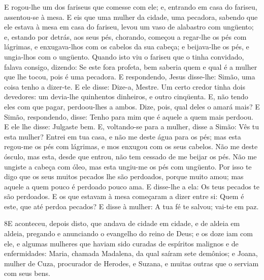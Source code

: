 E rogou-lhe um dos fariseus que comesse com ele; e, entrando em
casa do fariseu, assentou-se à mesa. E eis que uma mulher da
cidade, uma pecadora, sabendo que ele estava à mesa em casa do
fariseu, levou um vaso de alabastro com ungüento; e, estando
por detrás, aos seus pés, chorando, começou a regar-lhe os pés com
lágrimas, e enxugava-lhos com os cabelos da sua cabeça; e
beijava-lhe os pés, e ungia-lhos com o ungüento. Quando isto
viu o fariseu que o tinha convidado, falava consigo, dizendo: Se
este fora profeta, bem saberia quem e qual é a mulher que lhe tocou,
pois é uma pecadora. E respondendo, Jesus disse-lhe: Simão,
uma coisa tenho a dizer-te. E ele disse: Dize-a, Mestre. Um
certo credor tinha dois devedores: um devia-lhe quinhentos
dinheiros, e outro cinqüenta. E, não tendo eles com que
pagar, perdoou-lhes a ambos. Dize, pois, qual deles o amará mais?
E Simão, respondendo, disse: Tenho para mim que é aquele a
quem mais perdoou. E ele lhe disse: Julgaste bem. E,
voltando-se para a mulher, disse a Simão: Vês tu esta mulher? Entrei
em tua casa, e não me deste água para os pés; mas esta regou-me os
pés com lágrimas, e mos enxugou com os seus cabelos. Não me
deste ósculo, mas esta, desde que entrou, não tem cessado de me
beijar os pés. Não me ungiste a cabeça com óleo, mas esta
ungiu-me os pés com ungüento. Por isso te digo que os seus
muitos pecados lhe são perdoados, porque muito amou; mas aquele a
quem pouco é perdoado pouco ama. E disse-lhe a ela: Os teus
pecados te são perdoados. E os que estavam à mesa começaram a
dizer entre si: Quem é este, que até perdoa pecados? E disse
à mulher: A tua fé te salvou; vai-te em paz.

\medskip

\lettrine{8} E aconteceu, depois disto, que andava de cidade
em cidade, e de aldeia em aldeia, pregando e anunciando o evangelho
do reino de Deus; e os doze iam com ele, e algumas mulheres que
haviam sido curadas de espíritos malignos e de enfermidades: Maria,
chamada Madalena, da qual saíram sete demônios; e Joana, mulher
de Cuza, procurador de Herodes, e Suzana, e muitas outras que o
serviam com seus bens.

